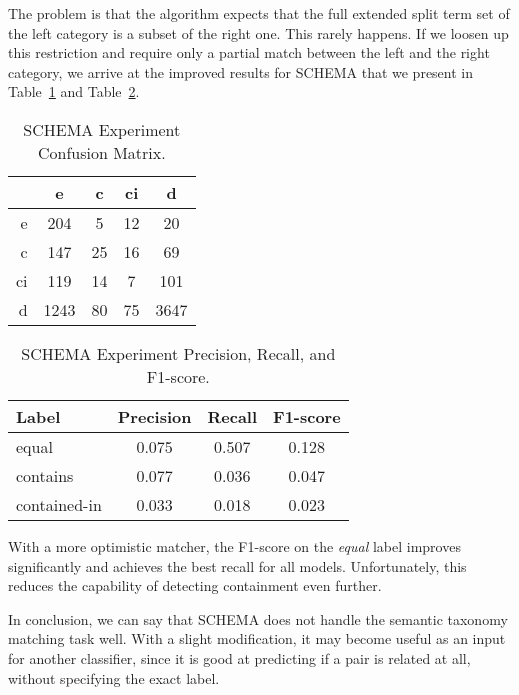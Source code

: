 The problem is that the algorithm expects that the full extended split term set of the left category is a subset
of the right one.
This rarely happens.
If we loosen up this restriction and require only a partial match between the left and the right category, we arrive
at the improved results for SCHEMA that we present in Table~\ref{tab:schema-experiment-cm} and Table~\ref{tab:schema-experiment-evaluation}.

\begin{table}[htbp]
    \begin{center}
        \begin{tabular}{r|cccc}
            & e & c & ci & d \\
            \hline
            e & 204 & 5 & 12 & 20 \\
            c & 147 & 25 & 16 & 69 \\
            ci & 119 & 14 & 7 & 101 \\
            d & 1243 & 80 & 75 & 3647 \\
        \end{tabular}
        \caption{SCHEMA Experiment Confusion Matrix.}
        \label{tab:schema-experiment-cm}
    \end{center}
\end{table}

\begin{table}[htbp]
    \begin{center}
        \begin{tabular}{l|ccc}
            Label & Precision & Recall & F1-score \\
            \hline
            equal & 0.075 & 0.507 & 0.128 \\
            contains & 0.077 & 0.036 & 0.047 \\
            contained-in & 0.033 & 0.018 & 0.023 \\
        \end{tabular}
        \caption{SCHEMA Experiment Precision, Recall, and F1-score.}
        \label{tab:schema-experiment-evaluation}
    \end{center}
\end{table}

With a more optimistic matcher, the F1-score on the \emph{equal} label improves significantly and achieves the best recall
for all models.
Unfortunately, this reduces the capability of detecting containment even further.

In conclusion, we can say that SCHEMA does not handle the semantic taxonomy matching task well.
With a slight modification, it may become useful as an input for another classifier, since it is good at predicting
if a pair is related at all, without specifying the exact label.

